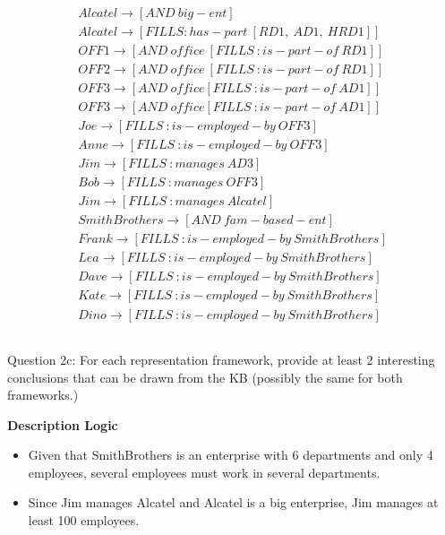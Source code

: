 \documentclass[11pt]{article}
\begin{document}
\begin{align*}
Alcatel \rightarrow [AND\ big-ent] \\
Alcatel \rightarrow [FILLS :has-part\ [RD1,\ AD1,\ HRD1]] \\ 
OFF1 \rightarrow [AND\ office\ [FILLS\ :is-part-of\ RD1]] \\
OFF2 \rightarrow [AND \ office\ [FILLS\ :is-part-of\ RD1]] \\
OFF3 \rightarrow [AND\ office [FILLS\ :is-part-of\ AD1]] \\
OFF3 \rightarrow [AND\ office [FILLS\ :is-part-of\ AD1]] \\
Joe \rightarrow [FILLS\ :is-employed-by\ OFF3] \\
Anne \rightarrow [FILLS\ :is-employed-by\ OFF3] \\
Jim \rightarrow [FILLS\ :manages\ AD3] \\ 
Bob \rightarrow [FILLS\ :manages\ OFF3] \\
Jim \rightarrow [FILLS\ :manages\ Alcatel] \\ 
SmithBrothers \rightarrow [AND\ fam-based-ent] \\
Frank \rightarrow [FILLS\ :is-employed-by\ SmithBrothers] \\ 
Lea \rightarrow [FILLS\ :is-employed-by\ SmithBrothers] \\ 
Dave \rightarrow [FILLS\ :is-employed-by\ SmithBrothers] \\ 
Kate \rightarrow [FILLS\ :is-employed-by\ SmithBrothers] \\ 
Dino \rightarrow [FILLS\ :is-employed-by\ SmithBrothers] 
\end{align*}

\subsection{}
Question 2c:
For each representation framework, provide at least 2 interesting conclusions that can be drawn from the KB (possibly the same for both frameworks.)

\textbf{Description Logic}
\begin{itemize}
\item Given that SmithBrothers is an enterprise with 6 departments and only 4 employees, several employees must work in several departments.
\item Since Jim manages Alcatel and Alcatel is a big enterprise, Jim manages at least 100 employees. 
    \end{itemize}
\end{document}
